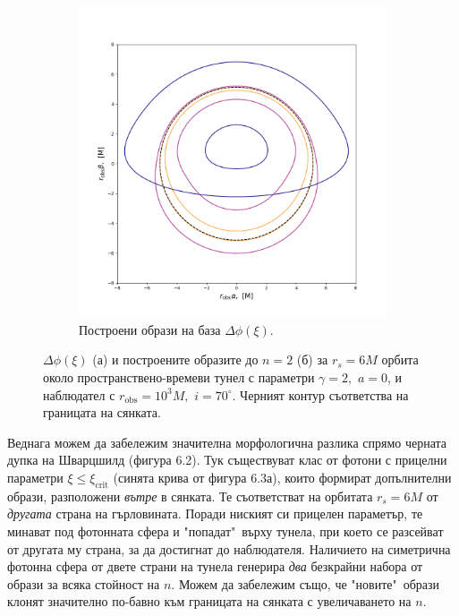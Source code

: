 \begin{figure}[h]
\begin{subfigure}{6cm}
		\includegraphics[scale = 0.3]{WH_70_deg_r6_gamma_2.png}
		\caption{Построени образи на база $\Delta\phi(\xi)$.\newline} \label{fig:1b}
	\end{subfigure}
	\caption[$\Delta\phi(\xi)$ и образите за $r_s=6M$ орбита около пространствено-времеви тунел до $n = 2$.]{\small $\Delta\phi(\xi)$ (а) и построените образите до $n = 2$ (б) за $r_s=6M$ орбита около пространствено-времеви тунел с параметри $\gamma = 2,\,\, a = 0$, и наблюдател с $r_\text{obs} = 10^3M,\,\,i = 70^\circ$. Черният контур съответства на границата на сянката.} 
	\label{WH_r6_orbit}
\end{figure}

\lfoot{}
Веднага можем да забележим значителна морфологична разлика спрямо черната дупка на Шварцшилд (фигура 6.2). Тук съществуват клас от фотони с прицелни параметри $\xi \le \xi_\text{crit}$ (синята крива от фигура 6.3а), които формират допълнителни образи, разположени \emph{вътре} в сянката. Те съответстват на орбитата $r_s = 6M$ от \emph{другата} страна на гърловината. Поради ниският си прицелен параметър, те минават под фотонната сфера и "попадат"$\,$ върху тунела, при което се разсейват от другата му страна, за да достигнат до наблюдателя. Наличието на симетрична фотонна сфера от двете страни на тунела генерира \emph{два} безкрайни набора от образи за всяка стойност на $n$. Можем да забележим също, че "новите"$\,$ образи клонят значително по-бавно към границата на сянката с увеличаването на $n$.\\

